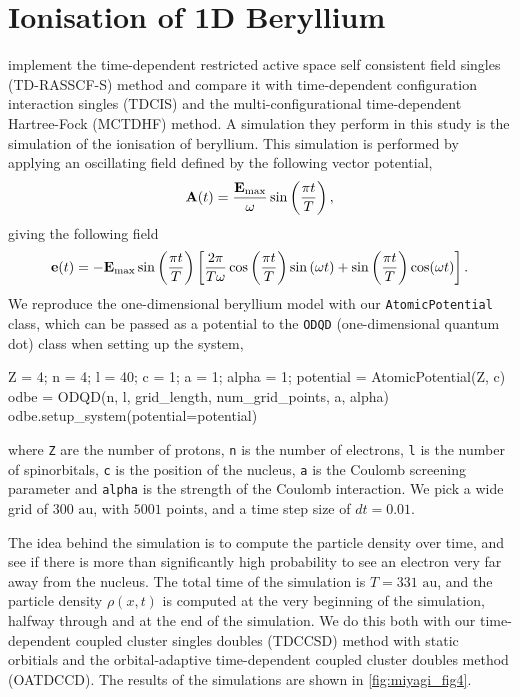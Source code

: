 \section{Ionisation of 1D Beryllium}
\label{sec:miyagi_replication}

\citeauthor{miyagi2013time}\cite{miyagi2013time} implement the time-dependent 
restricted active space self consistent field singles (TD-RASSCF-S) method 
and compare it with time-dependent configuration interaction singles (TDCIS) and 
the multi-configurational time-dependent Hartree-Fock (MCTDHF) method. A simulation they 
perform in this study is the simulation of the ionisation of beryllium. This 
simulation is performed by applying an oscillating field defined by the following 
vector potential,
\begin{equation}
    \vb{A}(t) = \frac{\vb{E}_\text{max}}{\omega}\sin\left(\frac{\pi t}{T} \right),
\end{equation}
giving the following field
\begin{equation}
    \vb{e}(t) = - \vb{E}_\text{max}\sin\left(\frac{\pi t}{T} \right)
    \left[
        \frac{2\pi}{T\omega} \cos\left(\frac{\pi t}{T} \right) \sin\left(\omega t \right)
        + \sin\left(\frac{\pi t}{T} \right) \cos(\omega t)
    \right].
\end{equation}
We reproduce the one-dimensional beryllium model with our \lstinline{AtomicPotential}
class, which can be passed as a potential to the \lstinline{ODQD}
(one-dimensional quantum dot) class when setting up the system,
\begin{python}
Z = 4; n = 4; l = 40; c = 1; a = 1; alpha = 1;
potential = AtomicPotential(Z, c)
odbe = ODQD(n, l, grid_length, num_grid_points, a, alpha)
odbe.setup_system(potential=potential)
\end{python}
where \lstinline{Z} are the number of protons, \lstinline{n} is the number of electrons,
\lstinline{l} is the number of spinorbitals, \lstinline{c} is the position of the nucleus,
\lstinline{a} is the Coulomb screening parameter and \lstinline{alpha} is the strength of the 
Coulomb interaction. We pick a wide grid of $300 \text{ au}$, with $5001$ points, and 
a time step size of $dt=0.01$.

The idea behind the simulation is to compute the particle density over time, and see if 
there is more than significantly high probability to see an electron very far away from the 
nucleus. The total time of the simulation is $T=331 \text{ au}$, and the particle density 
$\rho(x, t)$ is computed at the very beginning of the simulation, halfway through 
and at the end of the simulation. We do this both with our time-dependent coupled 
cluster singles doubles (TDCCSD) method with static orbitials and 
the orbital-adaptive time-dependent 
coupled cluster doubles method (OATDCCD). 
The results of the simulations are shown in 
\autoref{fig:miyagi_fig4}.

